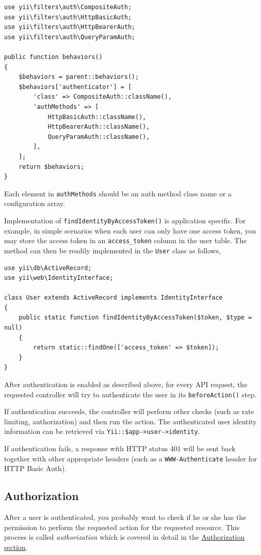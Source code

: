 \lstset{language=php}\begin{lstlisting}
use yii\filters\auth\CompositeAuth;
use yii\filters\auth\HttpBasicAuth;
use yii\filters\auth\HttpBearerAuth;
use yii\filters\auth\QueryParamAuth;

public function behaviors()
{
    $behaviors = parent::behaviors();
    $behaviors['authenticator'] = [
        'class' => CompositeAuth::className(),
        'authMethods' => [
            HttpBasicAuth::className(),
            HttpBearerAuth::className(),
            QueryParamAuth::className(),
        ],
    ];
    return $behaviors;
}
\end{lstlisting}
Each element in \lstinline|authMethods| should be an auth method class name or a configuration array.

Implementation of \lstinline|findIdentityByAccessToken()| is application specific. For example, in simple scenarios
when each user can only have one access token, you may store the access token in an \lstinline|access_token| column
in the user table. The method can then be readily implemented in the \lstinline|User| class as follows,

\lstset{language=php}\begin{lstlisting}
use yii\db\ActiveRecord;
use yii\web\IdentityInterface;

class User extends ActiveRecord implements IdentityInterface
{
    public static function findIdentityByAccessToken($token, $type = null)
    {
        return static::findOne(['access_token' => $token]);
    }
}
\end{lstlisting}
After authentication is enabled as described above, for every API request, the requested controller
will try to authenticate the user in its \lstinline|beforeAction()| step.

If authentication succeeds, the controller will perform other checks (such as rate limiting, authorization)
and then run the action. The authenticated user identity information can be retrieved via \lstinline|Yii::$app->user->identity|.

If authentication fails, a response with HTTP status 401 will be sent back together with other appropriate headers
(such as a \lstinline|WWW-Authenticate| header for HTTP Basic Auth).

\subsection{Authorization \label{rest-authentication.md::authorization}}
After a user is authenticated, you probably want to check if he or she has the permission to perform the requested
action for the requested resource. This process is called \textit{authorization} which is covered in detail in
the \hyperref[security-authorization.md]{Authorization section}.


